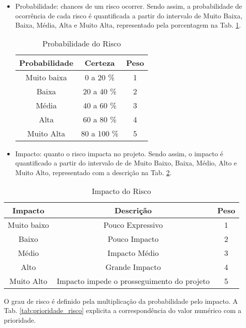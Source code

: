 \begin{itemize}
\item Probabilidade: chances de um risco ocorrer. Sendo assim, a probabilidade de ocorrência de cada risco é quantificada a partir do intervalo
de Muito Baixa, Baixa, Média, Alta e Muito Alta, representado pela porcentagem na Tab. \ref{tab:probabilidade}.

\begin{table}[H]
\centering
\caption{Probabilidade do Risco}
\label{tab:probabilidade}
\begin{tabular}{|c|c|c|}
\hline
\rowcolor[HTML]{A8DADC}
\textbf{Probabilidade} & \textbf{Certeza} & \textbf{Peso} \\ \hline
Muito baixa	 & 0 a 20 \% & 1
 \\ \hline
Baixa & 20 a 40 \% & 2 \\ \hline
Média & 40 a 60 \% & 3 \\ \hline
Alta & 60 a 80 \% & 4 \\ \hline
Muito Alta & 80 a 100 \% & 5 \\ \hline
\end{tabular}
\end{table}

\item Impacto: quanto o risco impacta no projeto. Sendo assim, o impacto é quantificado a partir do intervalo de de Muito Baixo, Baixa, Médio, Alto e Muito Alto, representado com a descrição na Tab. \ref{tab:impacto}.

\end{itemize}

\begin{table}[H]
\centering
\caption{ Impacto do Risco}
\label{tab:impacto}
\begin{tabular}{|c|c|c|}
\hline
\rowcolor[HTML]{A8DADC}
\textbf{Impacto} & \textbf{Descrição} & \textbf{Peso} \\ \hline
Muito baixo	 & Pouco Expressivo	 & 1
 \\ \hline
Baixo & Pouco Impacto & 2 \\ \hline
Médio & Impacto Médio & 3 \\ \hline
Alto & Grande Impacto & 4 \\ \hline
Muito Alto & Impacto impede o prosseguimento do projeto & 5 \\ \hline
\end{tabular}
\end{table}

O grau de risco é definido pela multiplicação da probabilidade pelo impacto. A Tab. \ref{tab:prioridade_risco} explicita a correspondência do valor numérico com a prioridade.

